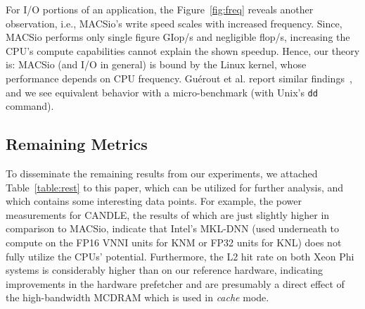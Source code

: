 For I/O portions of an application, the Figure~\ref{fig:freq} reveals another observation, i.e., MACSio's write speed
scales with increased frequency. Since, MACSio performs only single figure \unit[]{GIop/s} and negligible
\unit[]{flop/s}, increasing the CPU's compute capabilities cannot explain the shown speedup.
Hence, our theory is: MACSio (and I/O in general) is bound by the Linux kernel, whose performance depends on CPU frequency.
Gu{\'e}rout et al. report similar findings~\cite{guerout_energy-aware_2013}, and we see equivalent behavior with 
a micro-benchmark (with Unix's \texttt{dd} command).


\subsection{Remaining Metrics}\label{ssec:eval_rest}
%
To disseminate the remaining results from our experiments, we 
attached Table~\ref{table:rest} to this paper, which can be utilized for
further analysis, and which contains some interesting data points.
For example, the power measurements for CANDLE, the results of which are just slightly
higher in comparison to MACSio, indicate that Intel's MKL-DNN (used
underneath to compute on the FP16 VNNI units for KNM or FP32 units for KNL) does not
fully utilize the CPUs' potential. Furthermore, the L2 hit rate on both
Xeon Phi systems is considerably higher than on our reference
hardware, indicating improvements in the hardware prefetcher and are presumably
a direct effect of the high-bandwidth MCDRAM which is used in \textit{cache} mode.

